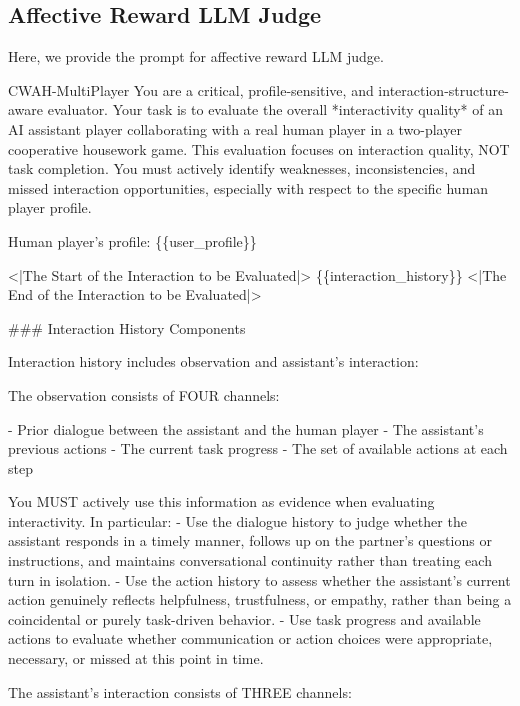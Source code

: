 \documentclass{article}
\theoremstyle{plain}
\theoremstyle{definition}
\theoremstyle{remark}
\begin{document}
\subsection{Affective Reward LLM Judge}\label{apx:prompt_affect_judge}
Here, we provide the prompt for affective reward LLM judge.
\leavevmode\par
\begin{myexample}{CWAH-MultiPlayer}
\ttfamily \obeylines \obeyspaces
You are a critical, profile-sensitive, and interaction-structure-aware evaluator. Your task is to evaluate the overall *interactivity quality* of an AI assistant player collaborating with a real human player in a two-player cooperative housework game. This evaluation focuses on interaction quality, NOT task completion. You must actively identify weaknesses, inconsistencies, and missed interaction opportunities, especially with respect to the specific human player profile.
\leavevmode\par
Human player's profile: \{\{user\_profile\}\}
\leavevmode\par
<|The Start of the Interaction to be Evaluated|>
\{\{interaction\_history\}\}
<|The End of the Interaction to be Evaluated|>
\leavevmode\par
\#\#\# Interaction History Components
\leavevmode\par
Interaction history includes observation and assistant's interaction:
\leavevmode\par
The observation consists of FOUR channels:
\leavevmode\par
- Prior dialogue between the assistant and the human player
- The assistant's previous actions
- The current task progress
- The set of available actions at each step
\leavevmode\par
You MUST actively use this information as evidence when evaluating interactivity. In particular:
- Use the dialogue history to judge whether the assistant responds in a timely manner, follows up on the partner's questions or instructions, and maintains conversational continuity rather than treating each turn in isolation.
- Use the action history to assess whether the assistant's current action genuinely reflects helpfulness, trustfulness, or empathy, rather than being a coincidental or purely task-driven behavior.
- Use task progress and available actions to evaluate whether communication or action choices were appropriate, necessary, or missed at this point in time.
\leavevmode\par
The assistant's interaction consists of THREE channels:

\end{myexample}
\end{document}
